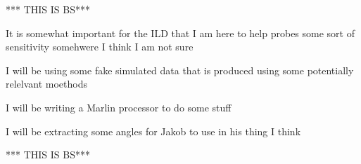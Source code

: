 
*** THIS IS BS***

It is somewhat important for the ILD that I am here to help probes some sort of sensitivity somehwere I think I am not sure

I will be using some fake simulated data that is produced using some potentially relelvant moethods

I will be writing a Marlin processor to do some stuff

I will be extracting some angles for Jakob to use in his thing I think

*** THIS IS BS***
